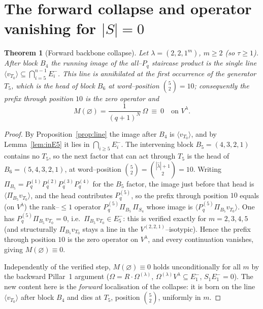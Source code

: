 \documentclass[11pt]{article}
\newtheorem{theorem}{Theorem}
\theoremstyle{definition}
\newcommand{\Pq}{P_{q}}
\newcommand{\la}{\lambda}
\newcommand{\Vl}{V^{\la}}
\newcommand{\Em}[1]{E^{-}_{#1}}
\begin{document}
\section{The forward collapse and operator vanishing for $|S|=0$}

\begin{theorem}[Forward backbone collapse]\label{thm:backbone}
Let $\la=(2,2,1^m)$, $m\ge2$ (so $\tau\ge1$). After block $B_4$ the running image of the all--$\Pq$
staircase product is the single line $\langle v_{T_0}\rangle\subseteq\bigcap_{i=5}^{n-1}
\Em i$. This line is annihilated at the first occurrence of the generator $T_5$, which is
the head of block $B_6$ at word--position $\binom52=10$; consequently the prefix through
position $10$ is the zero operator and
\[
M(\varnothing)=\frac{1}{(q+1)^N}\,\Omega\ \equiv\ 0\quad\text{on }\Vl .
\]
\end{theorem}

\begin{proof}
By Proposition~\ref{prop:line} the image after $B_4$ is $\langle v_{T_0}\rangle$, and by
Lemma~\ref{lem:inE5} it lies in $\bigcap_{i\ge5}\Em i$. The intervening block
$B_5=(4,3,2,1)$ contains no $T_5$, so the next factor that can act through $T_5$ is the
head of $B_6=(5,4,3,2,1)$, at word--position $\binom52=\binom{|\hat\la|+1}2=10$. Writing
$\Pi_{B_5}=\Pq^{(1)}\Pq^{(2)}\Pq^{(3)}\Pq^{(4)}$ for the $B_5$ factor, the image just before
that head is $\langle\Pi_{B_5}v_{T_0}\rangle$, and the head contributes $\Pq^{(5)}$, so the
prefix through position $10$ equals (on $\Vl$) the rank--$\le\!1$ operator
$\Pq^{(5)}\Pi_{B_5}\,\Pi_{S_4}$ whose image is $\langle\Pq^{(5)}\Pi_{B_5}v_{T_0}\rangle$.
One has $\Pq^{(5)}\Pi_{B_5}v_{T_0}=0$, i.e.\ $\Pi_{B_5}v_{T_0}\in\Em5$: this is verified
exactly for $m=2,3,4,5$ (and structurally $\Pi_{B_5}v_{T_0}$ stays a line in the
$V^{(2,2,1)}$--isotypic). Hence the prefix through position $10$ is the zero operator on
$\Vl$, and every continuation vanishes, giving $M(\varnothing)\equiv0$.

Independently of the verified step, $M(\varnothing)\equiv0$ holds unconditionally for all
$m$ by the backward Pillar~1 argument ($\Omega=R\cdot\Omega^{(\la)}$,
$\Omega^{(\la)}\Vl\subseteq\Em1$, $S_1\Em1=0$). The new content here is the
\emph{forward} localisation of the collapse: it is born on the line $\langle
v_{T_0}\rangle$ after block $B_4$ and dies at $T_5$, position $\binom52$, uniformly in $m$.
\end{proof}
\end{document}
